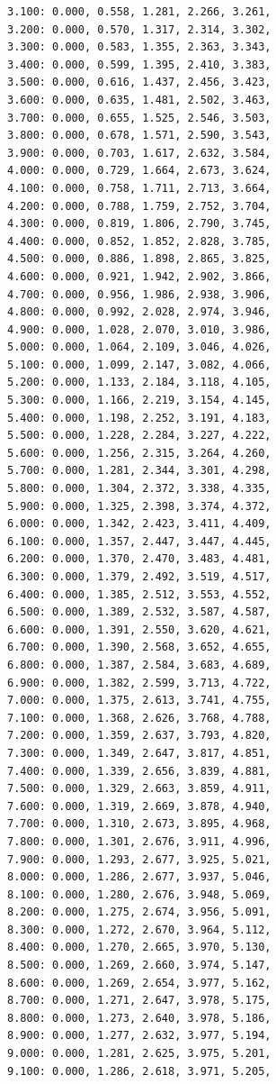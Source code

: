 \documentclass[12pt, a4paper]{article}
\begin{document}
\begin{scriptsize}
\begin{ttfamily}
\begin{lstlisting}
3.100: 0.000, 0.558, 1.281, 2.266, 3.261, 
3.200: 0.000, 0.570, 1.317, 2.314, 3.302, 
3.300: 0.000, 0.583, 1.355, 2.363, 3.343, 
3.400: 0.000, 0.599, 1.395, 2.410, 3.383, 
3.500: 0.000, 0.616, 1.437, 2.456, 3.423, 
3.600: 0.000, 0.635, 1.481, 2.502, 3.463, 
3.700: 0.000, 0.655, 1.525, 2.546, 3.503, 
3.800: 0.000, 0.678, 1.571, 2.590, 3.543, 
3.900: 0.000, 0.703, 1.617, 2.632, 3.584, 
4.000: 0.000, 0.729, 1.664, 2.673, 3.624, 
4.100: 0.000, 0.758, 1.711, 2.713, 3.664, 
4.200: 0.000, 0.788, 1.759, 2.752, 3.704, 
4.300: 0.000, 0.819, 1.806, 2.790, 3.745, 
4.400: 0.000, 0.852, 1.852, 2.828, 3.785, 
4.500: 0.000, 0.886, 1.898, 2.865, 3.825, 
4.600: 0.000, 0.921, 1.942, 2.902, 3.866, 
4.700: 0.000, 0.956, 1.986, 2.938, 3.906, 
4.800: 0.000, 0.992, 2.028, 2.974, 3.946, 
4.900: 0.000, 1.028, 2.070, 3.010, 3.986, 
5.000: 0.000, 1.064, 2.109, 3.046, 4.026, 
5.100: 0.000, 1.099, 2.147, 3.082, 4.066, 
5.200: 0.000, 1.133, 2.184, 3.118, 4.105, 
5.300: 0.000, 1.166, 2.219, 3.154, 4.145, 
5.400: 0.000, 1.198, 2.252, 3.191, 4.183, 
5.500: 0.000, 1.228, 2.284, 3.227, 4.222, 
5.600: 0.000, 1.256, 2.315, 3.264, 4.260, 
5.700: 0.000, 1.281, 2.344, 3.301, 4.298, 
5.800: 0.000, 1.304, 2.372, 3.338, 4.335, 
5.900: 0.000, 1.325, 2.398, 3.374, 4.372, 
6.000: 0.000, 1.342, 2.423, 3.411, 4.409, 
6.100: 0.000, 1.357, 2.447, 3.447, 4.445, 
6.200: 0.000, 1.370, 2.470, 3.483, 4.481, 
6.300: 0.000, 1.379, 2.492, 3.519, 4.517, 
6.400: 0.000, 1.385, 2.512, 3.553, 4.552, 
6.500: 0.000, 1.389, 2.532, 3.587, 4.587, 
6.600: 0.000, 1.391, 2.550, 3.620, 4.621, 
6.700: 0.000, 1.390, 2.568, 3.652, 4.655, 
6.800: 0.000, 1.387, 2.584, 3.683, 4.689, 
6.900: 0.000, 1.382, 2.599, 3.713, 4.722, 
7.000: 0.000, 1.375, 2.613, 3.741, 4.755, 
7.100: 0.000, 1.368, 2.626, 3.768, 4.788, 
7.200: 0.000, 1.359, 2.637, 3.793, 4.820, 
7.300: 0.000, 1.349, 2.647, 3.817, 4.851, 
7.400: 0.000, 1.339, 2.656, 3.839, 4.881, 
7.500: 0.000, 1.329, 2.663, 3.859, 4.911, 
7.600: 0.000, 1.319, 2.669, 3.878, 4.940, 
7.700: 0.000, 1.310, 2.673, 3.895, 4.968, 
7.800: 0.000, 1.301, 2.676, 3.911, 4.996, 
7.900: 0.000, 1.293, 2.677, 3.925, 5.021, 
8.000: 0.000, 1.286, 2.677, 3.937, 5.046, 
8.100: 0.000, 1.280, 2.676, 3.948, 5.069, 
8.200: 0.000, 1.275, 2.674, 3.956, 5.091, 
8.300: 0.000, 1.272, 2.670, 3.964, 5.112, 
8.400: 0.000, 1.270, 2.665, 3.970, 5.130, 
8.500: 0.000, 1.269, 2.660, 3.974, 5.147, 
8.600: 0.000, 1.269, 2.654, 3.977, 5.162, 
8.700: 0.000, 1.271, 2.647, 3.978, 5.175, 
8.800: 0.000, 1.273, 2.640, 3.978, 5.186, 
8.900: 0.000, 1.277, 2.632, 3.977, 5.194, 
9.000: 0.000, 1.281, 2.625, 3.975, 5.201, 
9.100: 0.000, 1.286, 2.618, 3.971, 5.205, 

\end{lstlisting}
\end{ttfamily}
\end{scriptsize}
\end{document}
